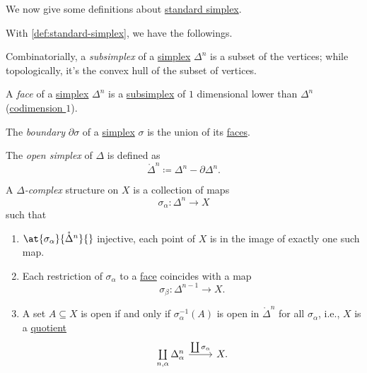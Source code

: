 We now give some definitions about \hyperref[def:standard-simplex]{standard simplex}.
\begin{definition*}
	With \autoref{def:standard-simplex}, we have the followings.
	\begin{definition}[Subsimplex]\label{def:subsimplex}
		Combinatorially, a \emph{subsimplex} of a \hyperref[def:standard-simplex]{simplex} \(\Delta^n\) is a
		subset of the vertices; while topologically, it's the convex hull of the subset of vertices.
		\begin{figure}[H]
			\centering
			\label{fig:def:subsimplex}
		\end{figure}
	\end{definition}

	\begin{definition}[Face]\label{def:face}
		A \emph{face} of a \hyperref[def:standard-simplex]{simplex} \(\Delta ^n\) is a \hyperref[def:subsimplex]{subsimplex} of \(1\) dimensional lower
		than \(\Delta ^n\) (\underline{codimension \(1\)}).
	\end{definition}

	\begin{definition}[Boundary]\label{def:boundary}
		The \emph{boundary} \(\partial \sigma \) of a \hyperref[def:standard-simplex]{simplex} \(\sigma \) is the union of its \hyperref[def:face]{faces}.
	\end{definition}

	\begin{definition}\label{def:open-simplex}
		The \emph{open simplex} of \(\Delta \) is defined as
		\[
			\mathring{\Delta}^n \coloneqq \Delta^n - \partial \Delta^n.
		\]
	\end{definition}
\end{definition*}

\begin{definition}\label{def:delta-complex}
	A \emph{\(\Delta \)-complex} structure on \(X\) is a collection of maps
	\[
		\sigma _\alpha \colon \Delta ^n\to X
	\]
	such that
	\begin{enumerate}
		\item \(\at{\sigma _\alpha }{\mathring{\Delta}^n}{}\) injective, each point of \(X\) is in the image of exactly one such map.
		\item Each restriction of \(\sigma _\alpha \) to a \hyperref[def:face]{face} coincides with a map
		      \[
			      \sigma _\beta \colon \Delta^{n-1} \to X.
		      \]
		\item A set \(A\subseteq X\) is open if and only if \(\sigma ^{-1} _\alpha (A)\) is open in \(\mathring{\Delta }^n\) for all
		      \(\sigma _\alpha \), i.e., \(X\) is a \hyperref[CW-complex-quotient]{quotient}
		      \[
			      \begin{tikzcd}
				      {\coprod\limits_{n, \alpha }\Delta ^n_\alpha} & {X.}
				      \arrow["{\coprod \sigma _\alpha}", from=1-1, to=1-2]
			      \end{tikzcd}
		      \]
	\end{enumerate}
\end{definition}

